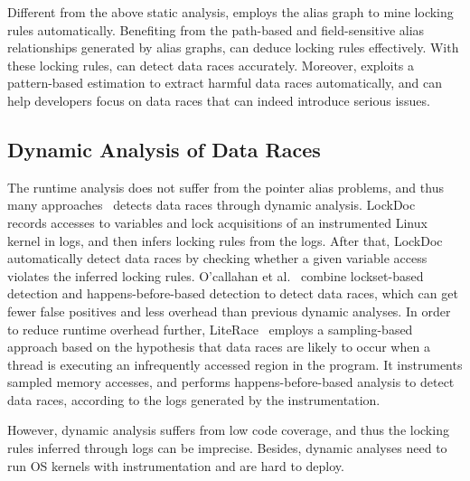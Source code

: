 Different from the above static analysis, \sys employs the alias graph to mine 
locking rules automatically. Benefiting from the path-based and field-sensitive 
alias relationships generated by alias graphs, \sys can deduce locking rules 
effectively. With these locking rules, \sys can detect data races accurately. 
Moreover, \sys exploits a pattern-based estimation to extract harmful data 
races automatically, and can help developers focus on data races that can 
indeed introduce serious issues.

\subsection{Dynamic Analysis of Data Races}
\label{subsec_dynamic}
The runtime analysis does not suffer from the pointer alias problems, and thus 
many approaches~\cite{Lochmann:EuroSys19, Lu:SOSP07, Lu:FSE18, Joshi:ASE08, 	
Liu:NSDI07, Ocallahan:PPoPP03, Serebryany:WBIA09, Marino:PLDI09} detects data 
races through dynamic analysis. LockDoc~\cite{Lochmann:EuroSys19} records 
accesses to variables and lock acquisitions of an instrumented Linux kernel in 
logs, and then infers locking rules from the logs. After that, LockDoc 
automatically detect data races by checking whether a given variable access 
violates the inferred locking rules. O'callahan et al.~\cite{Ocallahan:PPoPP03} 
combine lockset-based detection and happens-before-based detection to detect 
data races, which can get fewer false positives and less overhead than previous 
dynamic analyses. In order to reduce runtime overhead further, 
LiteRace~\cite{Marino:PLDI09} employs a sampling-based approach based on the 
hypothesis that data races are likely to occur when a thread is executing
an infrequently accessed region in the program. It instruments sampled memory 
accesses, and performs happens-before-based analysis to detect data races, 
according to the logs generated by the instrumentation.

However, dynamic analysis suffers from low code coverage, and thus the locking 
rules inferred through logs can be imprecise. Besides, dynamic analyses need to 
run OS kernels with instrumentation and are hard to deploy.


